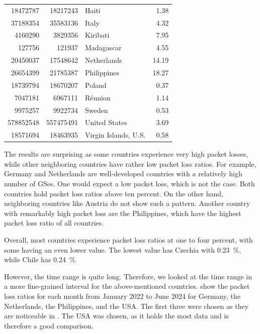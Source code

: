 \begin{table}
\begin{tabular}{rrlr}
		18472787  & 18217243  & Haiti                       & 1.38   \\
		37188354  & 35583136  & Italy                       & 4.32   \\
		4160290   & 3829356   & Kiribati                    & 7.95   \\
		127756    & 121937    & Madagascar                  & 4.55   \\
		20450037  & 17548642  & Netherlands                 & 14.19  \\
		26654399  & 21785387  & Philippines                 & 18.27  \\
		18739794  & 18670207  & Poland                      & 0.37   \\
		7047181   & 6967111   & Réunion                     & 1.14   \\
		9975257   & 9922734   & Sweden                      & 0.53   \\
		578852548 & 557475491 & United States               & 3.69   \\
		18571694  & 18463935  & Virgin Islands, U.S.        & 0.58   \\
		\bottomrule
	\end{tabular}
\end{table}

The results are surprising as some countries experience very high packet
losses, while other neighboring countries have rather low packet loss ratios.
For example, Germany and Netherlands are well-developed countries with a
relatively high number of \ac{GS}es. One would expect a low packet loss, which
is not the case. Both countries hold packet loss ratios above ten percent. On
the other hand, neighboring countries like Austria do not show such a pattern.
Another country with remarkably high packet loss are the Philippines, which
have the highest packet loss ratio of all countries.

Overall, most countries experience packet loss ratios at one to four percent,
with some having an even lower value. The lowest value has Czechia with
0.23~\%, while Chile has 0.24~\%.

However, the time range is quite long. Therefore, we looked at the time range
in a more fine-grained interval for the above-mentioned countries.
 show the packet loss ratios for each month
from January 2022 to June 2024 for Germany, the Netherlands, the Philippines,
and the USA. The first three were chosen as they are noticeable in
. The USA was chosen, as it holds the most data and
is therefore a good comparison.

